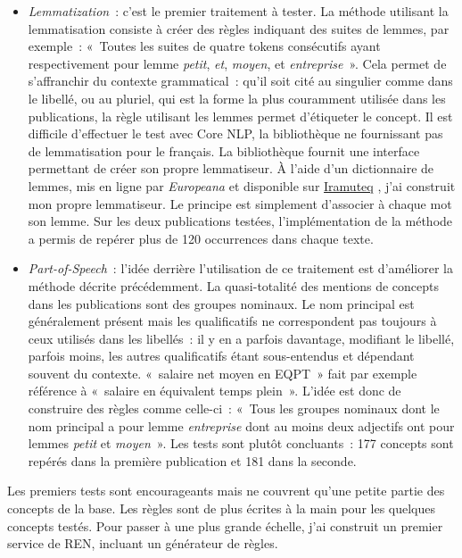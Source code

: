 \begin{itemize}
    \item \textit{Lemmatization}~: c'est le premier traitement à tester. La méthode utilisant la lemmatisation consiste à créer des règles indiquant des suites de lemmes, par exemple~: «~Toutes les suites de quatre tokens consécutifs ayant respectivement pour lemme \textit{petit}, \textit{et}, \textit{moyen}, et \textit{entreprise}~». Cela permet de s'affranchir du contexte grammatical~: qu'il soit cité au singulier comme dans le libellé, ou au pluriel, qui est la forme la plus couramment utilisée dans les publications, la règle utilisant les lemmes permet d'étiqueter le concept. Il est difficile d'effectuer le test avec Core NLP, la bibliothèque ne fournissant pas de lemmatisation pour le français. La bibliothèque fournit une interface permettant de créer son propre lemmatiseur. À l'aide d'un dictionnaire de lemmes, mis en ligne par \textit{Europeana} et disponible sur \href{http://www.iramuteq.org/}{Iramuteq} \cite{iramuteq}, j'ai construit mon propre lemmatiseur. Le principe est simplement d'associer à chaque mot son lemme. Sur les deux publications testées, l'implémentation de la méthode a permis de repérer plus de 120 occurrences dans chaque texte.
    \newline
    
    \item \textit{Part-of-Speech}~: l'idée derrière l'utilisation de ce traitement est d'améliorer la méthode décrite précédemment. La quasi-totalité des mentions de concepts dans les publications sont des groupes nominaux. Le nom principal est généralement présent mais les qualificatifs ne correspondent pas toujours à ceux utilisés dans les libellés~: il y en a parfois davantage, modifiant le libellé, parfois moins, les autres qualificatifs étant sous-entendus et dépendant souvent du contexte. «~salaire net moyen en EQPT~» fait par exemple référence à «~salaire en équivalent temps plein~». L'idée est donc de construire des règles comme celle-ci~: «~Tous les groupes nominaux dont le nom principal a pour lemme \textit{entreprise} dont au moins deux adjectifs ont pour lemmes \textit{petit} et \textit{moyen}~». Les tests sont plutôt concluants~: 177 concepts sont repérés dans la première publication et 181 dans la seconde.
    \newline
\end{itemize}

Les premiers tests sont encourageants mais ne couvrent qu'une petite partie des concepts de la base. Les règles sont de plus écrites à la main pour les quelques concepts testés. Pour passer à une plus grande échelle, j'ai construit un premier service de REN, incluant un générateur de règles.
\label{section 2.2.4}

